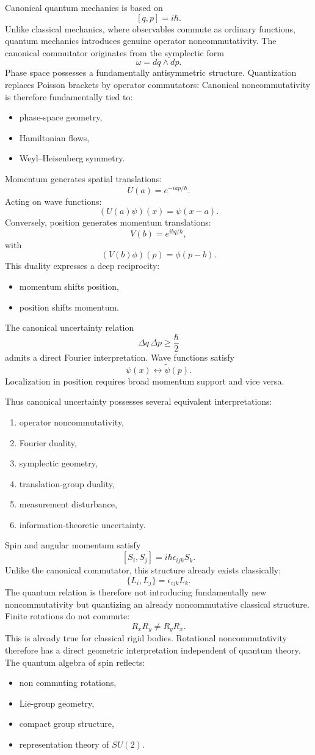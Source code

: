 Canonical quantum mechanics is based on
\[[q,p]=i\hbar.\]
Unlike classical mechanics, where observables commute as ordinary functions,
quantum mechanics introduces genuine operator noncommutativity.
The canonical commutator originates from the symplectic form
\[\omega=dq\wedge dp.\]
Phase space possesses a fundamentally antisymmetric structure. 
Quantization replaces Poisson brackets by operator commutators:
Canonical noncommutativity is therefore fundamentally tied to:
\begin{itemize}
\item phase-space geometry,
\item Hamiltonian flows,
\item Weyl--Heisenberg symmetry.
\end{itemize}

Momentum generates spatial translations:
\[U(a)=e^{-iap/\hbar}.\]
Acting on wave functions:
\[(U(a)\psi)(x)=\psi(x-a).\]
Conversely, position generates momentum translations:
\[V(b)=e^{ibq/\hbar},\]
with
\[(V(b)\phi)(p)=\phi(p-b).\]
This duality expresses a deep reciprocity:
\begin{itemize}
\item momentum shifts position,
\item position shifts momentum.
\end{itemize}

The canonical uncertainty relation
\[
\Delta q\,\Delta p\ge \frac{\hbar}{2}
\]
admits a direct Fourier interpretation.
Wave functions satisfy
\[
\psi(x)\leftrightarrow \tilde{\psi}(p).
\]
Localization in position requires broad momentum support and vice versa.

Thus canonical uncertainty possesses several equivalent interpretations:
\begin{enumerate}
\item operator noncommutativity,
\item Fourier duality,
\item symplectic geometry,
\item translation-group duality,
\item measurement disturbance,
\item information-theoretic uncertainty.
\end{enumerate}


Spin and angular momentum satisfy
\[[S_i,S_j]=i\hbar\epsilon_{ijk}S_k.\]
Unlike the canonical commutator, this structure already exists classically:
\[\{L_i,L_j\}=\epsilon_{ijk}L_k.\]
The quantum relation is therefore not introducing fundamentally new 
noncommutativity but quantizing an already noncommutative classical structure.
Finite rotations do not commute:
\[R_xR_y\neq R_yR_x.\]
This is already true for classical rigid bodies. Rotational noncommutativity
therefore has a direct geometric interpretation independent of quantum theory.
The quantum algebra of spin reflects:
\begin{itemize}
\item non commuting rotations,
\item Lie-group geometry,
\item compact group structure,
\item representation theory of $SU(2)$.
\end{itemize}

